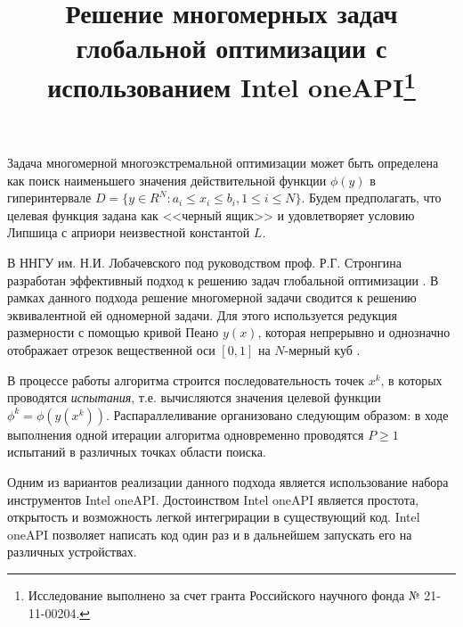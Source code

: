 \documentclass[11pt, oneside, a4paper]{article}
\begin{document}

\title{Решение многомерных задач глобальной оптимизации с использованием Intel oneAPI\footnote{Исследование выполнено за счет гранта Российского научного фонда № 21-11-00204.}}



Задача многомерной многоэкстремальной оптимизации может быть определена как поиск наименьшего значения действительной функции \(\phi(y)\)  в гиперинтервале \(D=\{y\in R^N:a_i\leqslant x_i\leqslant{b_i}, 1\leqslant{i}\leqslant{N}\}\). 
Будем предполагать, что целевая функция задана как <<черный ящик>> и удовлетворяет условию Липшица с априори неизвестной константой \(L\).

В ННГУ им. Н.И. Лобачевского под руководством проф. Р.Г. Стронгина разработан эффективный подход к решению задач глобальной оптимизации \cite{Strongin2013}. В рамках данного подхода решение многомерной задачи сводится к решению эквивалентной ей одномерной задачи. Для этого используется редукция размерности с помощью кривой Пеано \(y(x)\), которая непрерывно и однозначно отображает отрезок вещественной оси \([0,1]\) на \(N\)-мерный куб \cite{Sergeyev2013}.


В процессе работы алгоритма строится последовательность точек \(x^k\), в которых проводятся \textit{испытания}, т.е. вычисляются значения целевой функции \(\phi^k=\phi(y(x^k))\). Распараллеливание организовано следующим образом: в ходе выполнения одной итерации алгоритма одновременно проводятся \(P \geq 1\) испытаний в различных точках области поиска.

Одним из вариантов реализации данного подхода является использование набора инструментов Intel oneAPI. Достоинством Intel oneAPI является простота, открытость и возможность легкой интегрирации в существующий код. Intel oneAPI позволяет написать код один раз и в дальнейшем запускать его на различных устройствах. 
\end{document}
